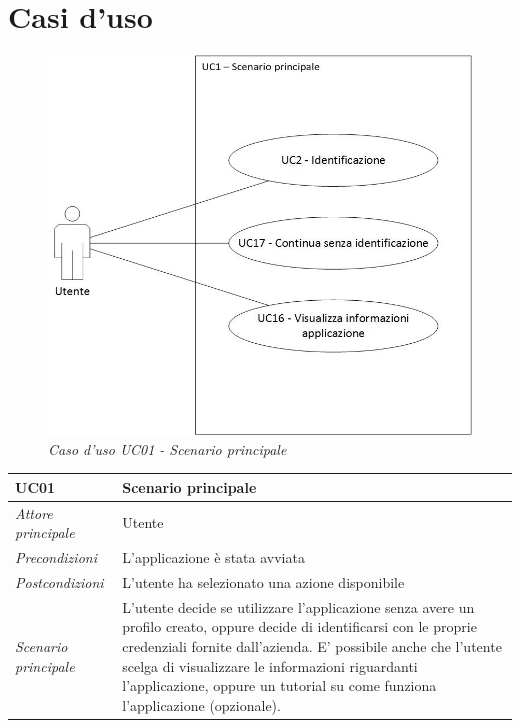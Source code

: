 \newpage
\chapter{Casi d'uso}
\label{cap:Casi d'uso}

	\begin{figure}[ht]
		\centering
		\includegraphics[scale=0.35]{immagini/analisi/UC01_scenario_principale.jpg}
		\caption{\textit{Caso d'uso UC01 - Scenario principale}}
	\end{figure}\FloatBarrier
	
	\begin{center}
		\begin{tabularx}{\textwidth}{p{3cm} p{9.30cm}}
			\hline
			\textbf{UC01} & \textbf{Scenario principale} \\
			\hline
			\textit{Attore principale} & Utente \\
			\hline
			\textit{Precondizioni} & L’applicazione è stata avviata\\
			\hline
			\textit{Postcondizioni} & L’utente ha selezionato una azione disponibile\\
			\hline
			\textit{Scenario principale} & L’utente decide se utilizzare l’applicazione senza avere un profilo creato, oppure decide di identificarsi con le proprie credenziali fornite dall’azienda. E’ possibile anche che l’utente scelga di visualizzare le informazioni riguardanti l’applicazione, oppure un tutorial su come funziona l’applicazione (opzionale).\\
			\hline
		\end{tabularx}
	\end{center}
	
